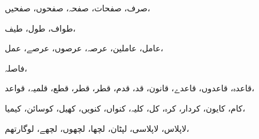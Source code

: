                                                                                                             صرف،            صفحات،            صفحہ،            صفحوں،            صفحیں،
                                                                                                            
                                                                                                                        طواف،            طول،            طیف،
                                                                                                                        
                                                                                                                                    عامل،            عاملین،            عرصہ،            عرصوں،            عرصے،            عمل،
                                                                                                                                    
                                                                                                                                                فاصلہ،            
                                                                                                                                                
                                                                                                                                                قاعدہ،            قاعدوں،            قاعدے،            قانون،            قد،            قدم،            قطر،            قطر،            قطع،            قلمیہ،            قواعد،
                                                                                                                                                
                                                                                                                                                            کام،            کایون،            کردار،            کرہ،            کل،            کلیہ،            کنواں،            کنویں،            کھیل،            کوسائن،            کیمیا،
                                                                                                                                                            
                                                                                                                                                                        لاپلاس،            لاپلاسی،            لپٹان،            لچھا،            لچھوں،            لچھے،            لوگارتھم،
                                                                                                                                                                        
